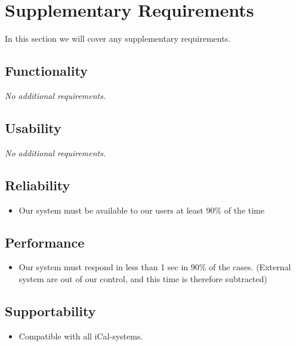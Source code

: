 \section{Supplementary Requirements}
In this section we will cover any supplementary requirements.
\subsection{Functionality}
\textit{No additional requirements.}
\subsection{Usability}
\textit{No additional requirements.}
\subsection{Reliability}
\begin{itemize}
  \item Our system must be available to our users at least 90\% of the time
\end{itemize}
\subsection{Performance}
\begin{itemize}
  \item Our system must respond in less than 1 sec in 90\% of the cases.
    (External system are out of our control, and this time is therefore
    subtracted)
\end{itemize}
\subsection{Supportability}
\begin{itemize}
  \item Compatible with all iCal-systems.
\end{itemize}
\newpage
